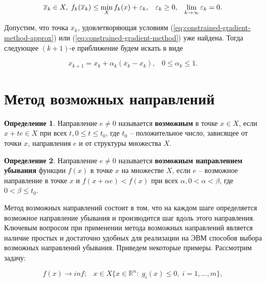 \documentclass[a4paper, 12pt, titlepage]{article}
\theoremstyle{definition}
\newtheorem{SmartDefinition}{Определение}
\theoremstyle{plain}
\theoremstyle{plain}
\begin{document}
\begin{equation}
 \label{eq:constrained-gradient-method-approx}
 \overline{x}_{k} \in X, \;
 f_{k}(\overline{x}_{k}) \leq \operatornamewithlimits{min}_{X} f_{k}(x) +
 \varepsilon_{k}, \;\;\; \varepsilon_{k} \geq 0, \;\;\;
 \operatornamewithlimits{lim}_{k \to \infty} \varepsilon_{k} = 0.
\end{equation}

Допустим, что точка $\overline{x}_{k}$, удовлетворяющая условиям
(\ref{eq:constrained-gradient-method-approx}) или
(\ref{eq:constrained-gradient-method}) уже найдена. Тогда следующее
$(k + 1)$-е приближение будем искать в виде

\begin{equation}
 x_{k + 1} = x_{k} + \alpha_{k} (\overline{x}_{k} - x_{k}), \;\;\;
 0 \leq \alpha_{k} \leq 1.
\end{equation}

\section{Метод возможных направлений}

\begin{SmartDefinition}
 Направление $e \neq 0$ называется \textbf{возможным} в точке $x \in X$,
 если $x + t e \in X$ при всех $t, 0 \leq t \leq t_{0}$, где $t_{0}$ --
 положительное число, зависящее от точки $x$, направления $e$ и от
 структуры множества $X$.
\end{SmartDefinition}

\begin{SmartDefinition}
 Направление $e \neq 0$ называется \textbf{возможным направлением убывания}
 функции $f(x)$ в точке $x$ на множестве $X$, если $e$ -- возможное
 направление в точке $x$ и $f(x + \alpha e) < f(x)$ при всех
 $\alpha, 0 < \alpha < \beta$, где $0 < \beta \leq t_{0}$.
\end{SmartDefinition}

Метод возможных направлений состоит в том, что на каждом шаге определяется
возможное направление убывания и производится шаг вдоль этого направления.
Ключевым вопросом при применении метода возможных направлений является
наличие простых и достаточно удобных для реализации на ЭВМ способов выбора
возможных направлений убывания. Приведем некоторые примеры. Рассмотрим
задачу:

\begin{equation}
 f(x) \to inf; \;\;\; x \in X \{x \in \mathbb{R}^{n}: \; g_{i}(x) \leq 0,
 \; i = 1, \ldots, m\},
\end{equation}
\end{document}
